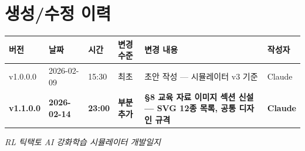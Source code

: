 \documentclass[11pt,a4paper]{article}
\begin{document}
\section*{생성/수정 이력}

\begin{center}
\renewcommand{\arraystretch}{1.3}
\small
\begin{tabular}{|l|l|l|l|p{5.5cm}|l|}
\hline
\rowcolor{tableheader}
\textbf{버전} & \textbf{날짜} & \textbf{시간} & \textbf{변경 수준} & \textbf{변경 내용} & \textbf{작성자} \\
\hline
v1.0.0.0 & 2026-02-09 & 15:30 & 최초 & 초안 작성 — 시뮬레이터 v3 기준 & Claude \\
\hline
\textbf{v1.1.0.0} & \textbf{2026-02-14} & \textbf{23:00} & \textbf{부분 추가} & \textbf{§8 교육 자료 이미지 섹션 신설 — SVG 12종 목록, 공통 디자인 규격} & \textbf{Claude} \\
\hline
\end{tabular}
\end{center}

\vfill
\begin{center}
\small\color{lightbrown}
\emph{RL 틱택토 AI 강화학습 시뮬레이터 개발일지}
\end{center}
\end{document}
